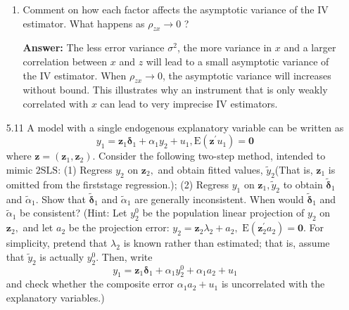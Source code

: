 \documentclass[UTF8]{article} %
\begin{document}
\begin{enumerate}
\begin{enumerate}
        \item Comment on how each factor affects the asymptotic variance of the IV estimator. What happens as $\rho_{z x} \rightarrow 0$ ?
        
        \textbf{Answer:} The less error variance $\sigma^2$, the more variance in $x$ and a larger correlation between $x$ and $z$ will lead to a small asymptotic variance of the IV estimator. When $\rho_{z x} \rightarrow 0$, the asymptotic variance will increases without bound. This illustrates why an instrument that is only weakly correlated with $x$ can lead to very imprecise IV estimators.
    \end{enumerate}
    
    
    \item[5.11] A model with a single endogenous explanatory variable can be written as
    \[ y_{1}=\mathbf{z}_{1} \boldsymbol{\delta}_{1}+\alpha_{1} y_{2}+u_{1}, \mathrm{E}\left(\mathbf{z}^{\prime} u_{1}\right)=\mathbf{0} \]
    where $\mathbf{z}=\left(\mathbf{z}_{1}, \mathbf{z}_{2}\right) .$ Consider the following two-step method, intended to mimic $2 \mathrm{SLS}$: (1) Regress $y_{2}$ on $\mathbf{z}_{2},$ and obtain fitted values, $\tilde{y}_{2}$(That is, $\mathbf{z}_{1}$ is omitted from the firststage regression.); (2) Regress $y_{1}$ on $\mathbf{z}_{1}, \tilde{y}_{2}$ to obtain $\tilde{\boldsymbol{\delta}}_{1}$ and $\tilde{\alpha}_{1} .$ Show that $\tilde{\boldsymbol{\delta}}_{1}$ and $\tilde{\alpha}_{1}$ are generally inconsistent. When would $\tilde{\boldsymbol{\delta}}_{1}$ and $\tilde{\alpha}_{1}$ be consistent? (Hint: Let $y_{2}^{0}$ be the population linear projection of $y_{2}$ on $\mathbf{z}_{2},$ and let $a_{2}$ be the projection error: $y_{2}=\mathbf{z}_{2} \lambda_{2}+a_{2},$ $\mathrm{E}\left(\mathbf{z}_{2}^{\prime} a_{2}\right)=\mathbf{0} .$ For simplicity, pretend that $\lambda_{2}$ is known rather than estimated; that is, assume that $\tilde{y}_{2}$ is actually $y_{2}^{0}$. Then, write
    \[ y_{1}=\mathbf{z}_{1} \boldsymbol{\delta}_{1}+\alpha_{1} y_{2}^{0}+\alpha_{1} a_{2}+u_{1} \]
    and check whether the composite error $\alpha_{1} a_{2}+u_{1}$ is uncorrelated with the explanatory variables.)
    

\end{enumerate}
\end{document}
